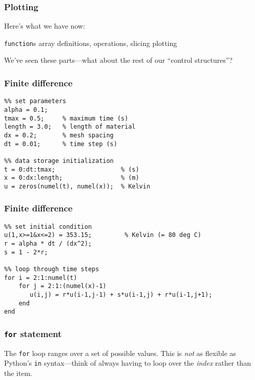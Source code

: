 \documentclass[11pt]{beamer}
\begin{document}
\begin{frame}[fragile]
  \frametitle{Plotting}
  \Enlarge

  \begin{enumerate}
  \myitem  Here's what we have now:
    \begin{enumerate}
    \mysubitem  \texttt{function}s
    \mysubitem  array definitions, operations, slicing
    \mysubitem  plotting
    \end{enumerate}
  \pause
  \myitem  We've seen these parts---what about the rest of our ``control structures''?
  \end{enumerate}
\end{frame}

\begin{frame}[fragile]
  \frametitle{Finite difference}

  \begin{Verbatim}
%% set parameters
alpha = 0.1;
tmax = 0.5;     % maximum time (s)
length = 3.0;   % length of material
dx = 0.2;       % mesh spacing
dt = 0.01;      % time step (s)

%% data storage initialization
t = 0:dt:tmax;                  % (s)
x = 0:dx:length;                % (m)
u = zeros(numel(t), numel(x));  % Kelvin
  \end{Verbatim}
\end{frame}

\begin{frame}[fragile]
  \frametitle{Finite difference}

  \begin{Verbatim}
%% set initial condition
u(1,x>=1&x<=2) = 353.15;         % Kelvin (= 80 deg C)
r = alpha * dt / (dx^2);
s = 1 - 2*r;

%% loop through time steps
for i = 2:1:numel(t)
    for j = 2:1:(numel(x)-1)
       u(i,j) = r*u(i-1,j-1) + s*u(i-1,j) + r*u(i-1,j+1);
    end
end
  \end{Verbatim}
\end{frame}

\begin{frame}[fragile]
  \frametitle{\texttt{for} statement}
  \Enlarge

  \begin{itemize}
  \myitem  The \texttt{for} loop ranges over a set of possible values. \pause
  \myitem  This is \emph{not} as flexible as Python's \texttt{in} syntax---think of always having to loop over the \emph{index} rather than the item.
  \end{itemize}
\end{frame}
\end{document}
